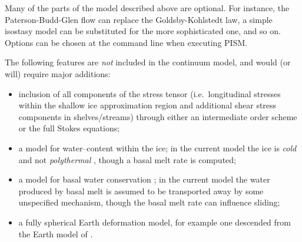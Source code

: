 \documentclass[12pt,final]{amsart}%
\theoremstyle{plain}
\theoremstyle{definition}
\theoremstyle{remark}
\begin{document}
Many of the parts of the model described above are optional.  For instance, the Paterson-Budd-Glen \citep{PatersonBudd} flow can replace the Goldsby-Kohlstedt law, a simple isostasy model can be substituted for the more sophisticated one, and so on.  Options can be chosen at the command line when executing PISM.

The following features are \emph{not} included in the continuum model, and would (or will) require major additions:
\begin{itemize}
\item inclusion of all components of the stress tensor (i.e.~longitudinal stresses within the shallow ice approximation region and additional shear stress components in shelves/streams) through either an intermediate order scheme \citep{Blatter,SaitoEISMINT} or the full Stokes equations;
\item a model for water--content within the ice; in the current model the ice is \emph{cold} and not \emph{polythermal} \citep[compare][]{Greve}, though a basal melt rate is computed;
\item a model for basal water conservation \citep[compare][]{JohnsonFastook}; in the current model the water produced by basal melt is assumed to be transported away by some unspecified mechanism, though the basal melt rate can influence sliding;
\item a fully spherical Earth deformation model, for example one descended from the Earth model of \citet{Peltier}.
\end{itemize}
\end{document}
